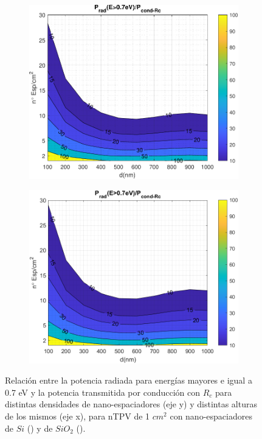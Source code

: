 \begin{figure} [h]%
	\centering
	\begin{subfigure}[b]{0.48\textwidth}%
			\includegraphics[width=\columnwidth]{rel_SiC}%
			\caption{}%
			\label{fig:prc_SiCSi}%
	\end{subfigure}
	\hfill
	\begin{subfigure}[b]{0.48\textwidth}%
			\includegraphics[width=\columnwidth]{SiC_Rc}%
			\caption{}%
			\label{fig:prc_SiCSiO2}%
	\end{subfigure}
	\caption{\small
	Relación entre la potencia radiada para energías mayores e igual a 0.7 eV y la potencia transmitida por conducción con $R_c$ para distintas densidades de nano-espaciadores (eje y) y distintas alturas de los mismos (eje x), para nTPV de 1 $cm^2$ con nano-espaciadores de $Si$ () y de $SiO_2$ (). 
}
\end{figure}
